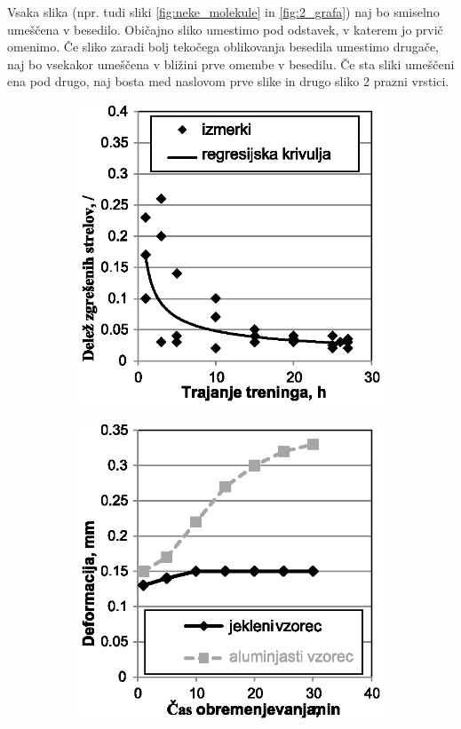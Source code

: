 Vsaka slika (npr. tudi sliki \ref{fig:neke_molekule} in \ref{fig:2_grafa}) naj bo smiselno umeščena v besedilo. Običajno sliko umestimo pod odstavek, v katerem jo prvič omenimo. Če sliko zaradi bolj tekočega oblikovanja besedila umestimo drugače, naj bo vsekakor umeščena v bližini prve omembe v besedilu. Če sta sliki umeščeni ena pod drugo, naj bosta med naslovom prve slike in drugo sliko 2 prazni vrstici.\\

\begin{figure}
    \begin{subfigure}[b]{.45\linewidth}
        \centering \includegraphics[scale=0.7]{slike/graf_1}
        \caption{}\label{subfig:graf1}
    \end{subfigure}%
    \quad
    \begin{subfigure}[b]{.45\linewidth}
        \centering \includegraphics[scale=0.7]{slike/graf_2}

\end{subfigure}
\end{figure}
